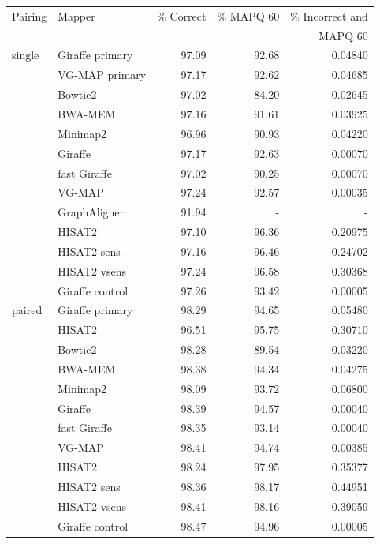 \documentclass[11pt]{ucscthesis}
\begin{document}
\begin{table}[p]
    \centering
    \begin{tabular}{|l|l|r|r|r|}
    \hline
        Pairing & Mapper & \% Correct & \% MAPQ 60 & \% Incorrect and\\
               &         &            &            & MAPQ 60          \\
        \hline
        single  & Giraffe primary	& 97.09     & 92.68     & 0.04840 \\
                & VG-MAP primary   	& 97.17     & 92.62     & 0.04685 \\
                & Bowtie2	        & 97.02     & 84.20     & 0.02645 \\
                & BWA-MEM	        & 97.16     & 91.61     & 0.03925 \\
                & Minimap2	        & 96.96     & 90.93     & 0.04220 \\
                & Giraffe	        & 97.17     & 92.63     & 0.00070 \\
                & fast Giraffe	    & 97.02     & 90.25     & 0.00070 \\
                & VG-MAP	        & 97.24     & 92.57     & 0.00035 \\
                & GraphAligner 	    & 91.94     & -      & - \\
                & HISAT2	        & 97.10     & 96.36     & 0.20975 \\
                & HISAT2 sens   	& 97.16     & 96.46     & 0.24702 \\
                & HISAT2 vsens	    & 97.24     & 96.58     & 0.30368 \\
                & Giraffe control	& 97.26     & 93.42     & 0.00005 \\

        \hline
        paired  & Giraffe primary	& 98.29     & 94.65     & 0.05480 \\
                & HISAT2	        & 96.51     & 95.75     & 0.30710 \\
                & Bowtie2       	& 98.28     & 89.54     & 0.03220 \\
                & BWA-MEM       	& 98.38     & 94.34     & 0.04275 \\
                & Minimap2      	& 98.09     & 93.72     & 0.06800 \\
                & Giraffe       	& 98.39     & 94.57     & 0.00040 \\
                & fast Giraffe  	& 98.35     & 93.14     & 0.00040 \\
                & VG-MAP	        & 98.41     & 94.74     & 0.00385 \\
                & HISAT2	        & 98.24     & 97.95     & 0.35377 \\
                & HISAT2 sens   	& 98.36     & 98.17     & 0.44951 \\
                & HISAT2 vsens	    & 98.41     & 98.16     & 0.39059 \\
                & Giraffe control	& 98.47     & 94.96     & 0.00005 \\


\end{tabular}
\end{table}
\end{document}
